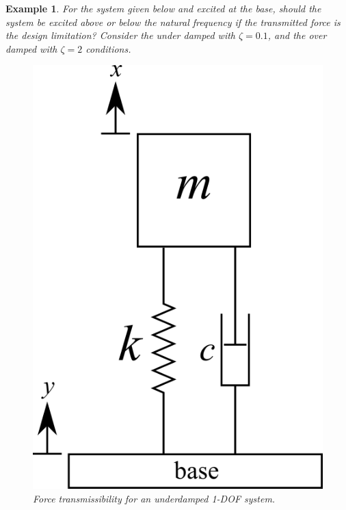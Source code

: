 \documentclass[12pt,letter]{article}
\newtheorem{ex}{Example}
\numberwithin{ex}{section} %
\newenvironment{example}{\begin{mdframed}[middlelinewidth=0.5mm]\begin{ex}\normalfont}{\end{ex}\end{mdframed}}
\numberwithin{re}{section} %
\numberwithin{vcs}{section} %
\begin{document}
				\begin{example}
					
					For the system given below and excited at the base, should the system be excited above or below the natural frequency if the transmitted force is the design limitation? Consider the under damped with $\zeta=0.1$, and the over damped with $\zeta=2$ conditions. 
		
					\begin{figure}[H]
						\centering
						\includegraphics[]{../figures/1_DOF_spring_dashpot_mass_vertical_base_excited.png}
						\caption{Force transmissibility for an underdamped 1-DOF system.}
					\end{figure}		
				

\end{example}
\end{document}
